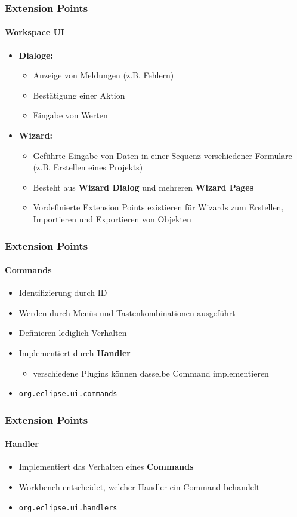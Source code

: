 {\begin{frame}
  \frametitle{Extension Points}
  \framesubtitle{Workspace UI}
  \begin{itemize}
    \item \textbf{Dialoge:}
    \begin{itemize}
      \item Anzeige von Meldungen (z.B. Fehlern)
      \item Bestätigung einer Aktion
      \item Eingabe von Werten
    \end{itemize}
    \item \textbf{Wizard:}
    \begin{itemize}
      \item Geführte Eingabe von Daten in einer Sequenz verschiedener Formulare (z.B. Erstellen eines Projekts)
      \item Besteht aus \textbf{Wizard Dialog} und mehreren \textbf{Wizard Pages}
      \item Vordefinierte Extension Points existieren für Wizards zum Erstellen, Importieren und Exportieren von Objekten
    \end{itemize}
  \end{itemize}
\end{frame}

\begin{frame}
  \frametitle{Extension Points}
  \framesubtitle{Commands}
  \begin{itemize}
    \item Identifizierung durch ID
    \item Werden durch Menüs und Tastenkombinationen ausgeführt
    \item Definieren lediglich Verhalten
    \item Implementiert durch \textbf{Handler}
    \begin{itemize}
      \item verschiedene Plugins können dasselbe Command implementieren
    \end{itemize}
    \item \texttt{org.eclipse.ui.commands}
  \end{itemize}
\end{frame}

\begin{frame}
  \frametitle{Extension Points}
  \framesubtitle{Handler}
  \begin{itemize}
    \item Implementiert das Verhalten eines \textbf{Commands}
    \item Workbench entscheidet, welcher Handler ein Command behandelt
    \item \texttt{org.eclipse.ui.handlers}
  \end{itemize}
\end{frame}

}
